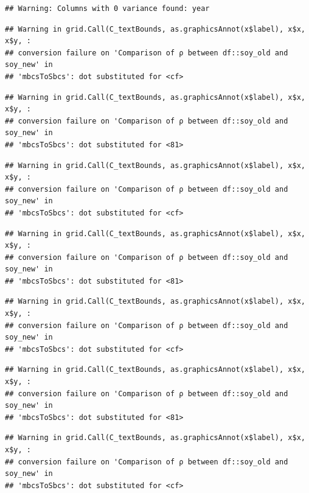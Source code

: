 \documentclass[
]{book}
\begin{document}
\begin{verbatim}
## Warning: Columns with 0 variance found: year
\end{verbatim}

\begin{verbatim}
## Warning in grid.Call(C_textBounds, as.graphicsAnnot(x$label), x$x, x$y, :
## conversion failure on 'Comparison of ρ between df::soy_old and soy_new' in
## 'mbcsToSbcs': dot substituted for <cf>
\end{verbatim}

\begin{verbatim}
## Warning in grid.Call(C_textBounds, as.graphicsAnnot(x$label), x$x, x$y, :
## conversion failure on 'Comparison of ρ between df::soy_old and soy_new' in
## 'mbcsToSbcs': dot substituted for <81>
\end{verbatim}

\begin{verbatim}
## Warning in grid.Call(C_textBounds, as.graphicsAnnot(x$label), x$x, x$y, :
## conversion failure on 'Comparison of ρ between df::soy_old and soy_new' in
## 'mbcsToSbcs': dot substituted for <cf>
\end{verbatim}

\begin{verbatim}
## Warning in grid.Call(C_textBounds, as.graphicsAnnot(x$label), x$x, x$y, :
## conversion failure on 'Comparison of ρ between df::soy_old and soy_new' in
## 'mbcsToSbcs': dot substituted for <81>
\end{verbatim}

\begin{verbatim}
## Warning in grid.Call(C_textBounds, as.graphicsAnnot(x$label), x$x, x$y, :
## conversion failure on 'Comparison of ρ between df::soy_old and soy_new' in
## 'mbcsToSbcs': dot substituted for <cf>
\end{verbatim}

\begin{verbatim}
## Warning in grid.Call(C_textBounds, as.graphicsAnnot(x$label), x$x, x$y, :
## conversion failure on 'Comparison of ρ between df::soy_old and soy_new' in
## 'mbcsToSbcs': dot substituted for <81>
\end{verbatim}

\begin{verbatim}
## Warning in grid.Call(C_textBounds, as.graphicsAnnot(x$label), x$x, x$y, :
## conversion failure on 'Comparison of ρ between df::soy_old and soy_new' in
## 'mbcsToSbcs': dot substituted for <cf>
\end{verbatim}
\end{document}
